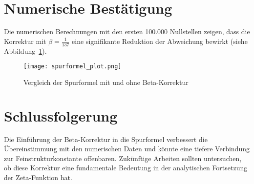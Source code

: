\documentclass[a4paper,12pt]{article}
\begin{document}
\section{Numerische Bestätigung}
Die numerischen Berechnungen mit den ersten 100.000 Nullstellen zeigen, dass die Korrektur mit \( \beta = \frac{1}{137} \) eine signifikante Reduktion der Abweichung bewirkt (siehe Abbildung~\ref{fig:spur}).

\begin{figure}[h]
    \centering
    \texttt{[image: spurformel\_plot.png]}
    \caption{Vergleich der Spurformel mit und ohne Beta-Korrektur}
    \label{fig:spur}
\end{figure}

\section{Schlussfolgerung}
Die Einführung der Beta-Korrektur in die Spurformel verbessert die Übereinstimmung mit den numerischen Daten und könnte eine tiefere Verbindung zur Feinstrukturkonstante offenbaren. Zukünftige Arbeiten sollten untersuchen, ob diese Korrektur eine fundamentale Bedeutung in der analytischen Fortsetzung der Zeta-Funktion hat.
\end{document}
